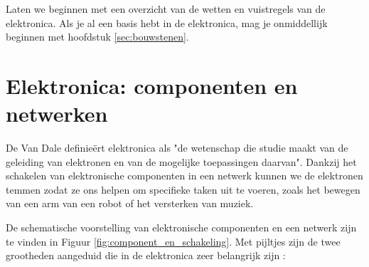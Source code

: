 \documentclass{article}
\begin{document}

		Laten we beginnen met een overzicht van de wetten en vuistregels van de elektronica. Als je al een basis hebt in de elektronica, mag je onmiddellijk beginnen met hoofdstuk \ref{sec:bouwstenen}.
	\section{Elektronica: componenten en netwerken}

		De Van Dale definie\"ert elektronica als "de wetenschap die studie maakt van de geleiding van elektronen en van de mogelijke toepassingen daarvan".
		Dankzij het schakelen van elektronische componenten in een netwerk kunnen we de elektronen temmen zodat ze ons helpen om specifieke taken uit te voeren, zoals het bewegen van een arm van een robot of het versterken van muziek.


		De schematische voorstelling van elektronische componenten en een netwerk zijn te vinden in Figuur \ref{fig:component_en_schakeling}. Met pijltjes zijn de twee grootheden aangeduid die in de elektronica zeer belangrijk zijn :
\end{document}
